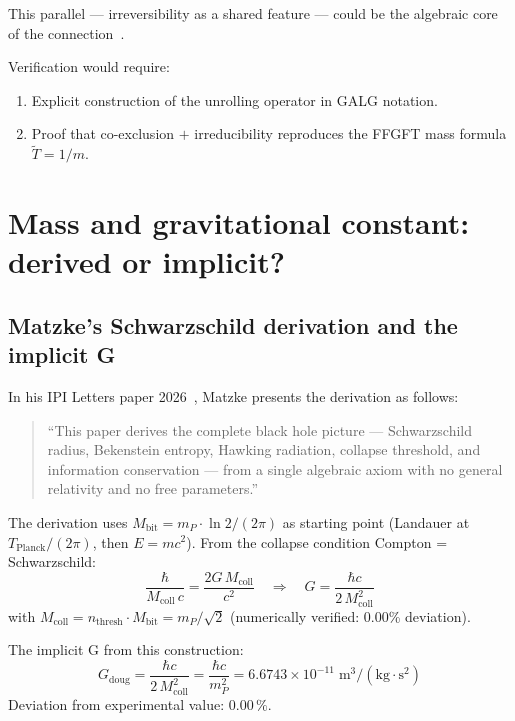 This parallel --- irreversibility as a shared feature ---
could be the algebraic core of the connection~\SM.

Verification would require:
\begin{enumerate}
  \item Explicit construction of the unrolling operator
    in GALG notation.
  \item Proof that co-exclusion $+$ irreducibility reproduces
    the FFGFT mass formula $\tilde{T}=1/m$.
\end{enumerate}

\section{Mass and gravitational constant: derived or implicit?}

\subsection{Matzke's Schwarzschild derivation and the implicit G}

In his IPI Letters paper 2026~\cite{Matzke2026IPI}, Matzke presents the derivation as follows:
\begin{quote}
``This paper derives the complete black hole picture ---
Schwarzschild radius, Bekenstein entropy, Hawking radiation,
collapse threshold, and information conservation --- from a single
algebraic axiom with no general relativity and no free parameters.''
\end{quote}

The derivation uses $M_\text{bit} = m_P \cdot \ln 2 / (2\pi)$
as starting point (Landauer at $T_\text{Planck}/(2\pi)$, then $E = mc^2$).
From the collapse condition Compton = Schwarzschild:
\begin{equation}
  \frac{\hbar}{M_\text{coll}\,c} = \frac{2G\,M_\text{coll}}{c^2}
  \quad\Rightarrow\quad
  G = \frac{\hbar c}{2\,M_\text{coll}^2}
\end{equation}
with $M_\text{coll} = n_\text{thresh}\cdot M_\text{bit} = m_P/\sqrt{2}$
(numerically verified: 0.00\% deviation).

The implicit G from this construction:
\begin{equation}
  G_\text{doug} = \frac{\hbar c}{2\,M_\text{coll}^2}
  = \frac{\hbar c}{m_P^2}
  = 6.6743\times10^{-11}\;\text{m}^3/(\text{kg}\cdot\text{s}^2)
\end{equation}
Deviation from experimental value: $0.00\,\%$.

